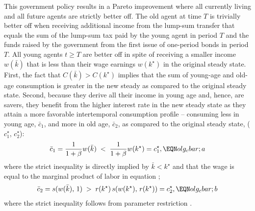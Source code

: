 This government policy results in a Pareto
improvement where all currently living and all future 
agents are strictly better off. The old agent at time $T$ is 
trivially better off when receiving additional income 
from the lump-sum transfer
that equals the sum of the lump-sum tax paid by the young 
agent in period  $T$ and the funds raised by the government 
from the first issue of one-period bonds in period $T$. 
All young agents $t\geq T$ are better off in 
spite of receiving a smaller income $w(\bar k)$ that is less
than their wage earnings $w(k^\star)$ in the original steady 
state. First, the fact that $C(\bar k) > C(k^\star)$ implies 
that the sum of young-age and old-age consumption is greater 
in the new steady as compared to the original steady state. Second, 
because they derive all their income in young age and,
hence, are savers, they benefit from the higher interest 
rate in the new steady state as they attain a more
favorable intertemporal consumption profile --
consuming less in young age, $\bar c_1$, and more in old age, 
$\bar c_2$, as compared to the original steady state,
($c^\star_1$, $c^\star_2$):
$$
\bar c_1 
={1 \over 1+\beta} w(\bar k)\; <\; {1 \over 1+\beta} w(k^\star)
= c_1^\star,                                  \EQN olg_cbar;a
$$
where the strict inequality is directly implied by $\bar k < k^\star$
and that the wage is equal to the marginal product of labor
in equation ;
$$
\bar c_2 =s(w(\bar k),\,1) \; >\; 
r(k^\star) \, s(w(k^\star),\, r(k^\star)) = c_2^\star,
                                      \EQN olg_cbar;b
$$
where the strict inequality follows from parameter
restriction .




